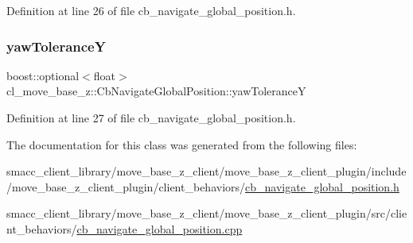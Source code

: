 Definition at line 26 of file cb\+\_\+navigate\+\_\+global\+\_\+position.\+h.

\mbox{\label{classcl__move__base__z_1_1CbNavigateGlobalPosition_a2405f30f99b72c7daae79175f3e78677}} 
\subsubsection{\texorpdfstring{yaw\+ToleranceY}{yawToleranceY}}
{\footnotesize\ttfamily boost\+::optional$<$float$>$ cl\+\_\+move\+\_\+base\+\_\+z\+::\+Cb\+Navigate\+Global\+Position\+::yaw\+ToleranceY}



Definition at line 27 of file cb\+\_\+navigate\+\_\+global\+\_\+position.\+h.



The documentation for this class was generated from the following files\+:\begin{DoxyCompactItemize}
\item 
smacc\+\_\+client\+\_\+library/move\+\_\+base\+\_\+z\+\_\+client/move\+\_\+base\+\_\+z\+\_\+client\+\_\+plugin/include/move\+\_\+base\+\_\+z\+\_\+client\+\_\+plugin/client\+\_\+behaviors/\hyperlink{cb__navigate__global__position_8h}{cb\+\_\+navigate\+\_\+global\+\_\+position.\+h}\item 
smacc\+\_\+client\+\_\+library/move\+\_\+base\+\_\+z\+\_\+client/move\+\_\+base\+\_\+z\+\_\+client\+\_\+plugin/src/client\+\_\+behaviors/\hyperlink{cb__navigate__global__position_8cpp}{cb\+\_\+navigate\+\_\+global\+\_\+position.\+cpp}\end{DoxyCompactItemize}
